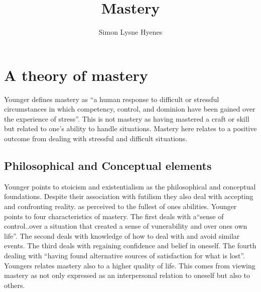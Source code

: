 \documentclass[../MasterThesis.tex]{subfiles}
\author{Simon Lysne Hyenes}
\title{Mastery}
\begin{document}
\section{A theory of mastery}
Younger defines mastery as ``a human response to difficult or stressful circumstances in which competency, control, and dominion have been gained over the experience of stress''\cite[p.76]{Younger1991Theory}. This is not mastery as having mastered a craft or skill but related to one's ability to handle situations. Mastery here relates to a positive outcome from dealing with stressful and difficult situations. 

\subsection{Philosophical and Conceptual elements}
Younger points to stoicism and existentialism as the philosophical and conceptual foundations. Despite their association with futilism they also deal with accepting and confronting reality. as perceived to the fullest of ones abilities.
Younger points to four characteristics of mastery. The first deals with a``sense of control..over a situation that created a sense of vunerability and over ones own life''\cite[p.81]{Younger1991Theory}. The second deals with knowledge of how to deal with and avoid similar events. The third deals with regaining confidence and belief in oneself. The fourth dealing with ``having found alternative sources of satisfaction for what is lost''\cite[p.81]{Younger1991Theory}. Youngers relates mastery also to a higher quality of life. This comes from viewing mastery as not only expressed as an interpersonal relation to oneself but also to others. 
\end{document}
